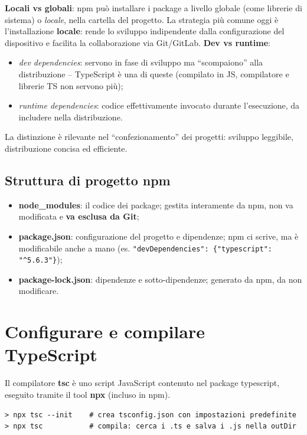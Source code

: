 \begin{importante}
\textbf{Locali vs globali}: npm pu\`o installare i package a livello globale (come librerie
di sistema) o \emph{locale}, nella cartella del progetto. La strategia pi\`u comune oggi \`e
l'installazione \textbf{locale}: rende lo sviluppo indipendente dalla configurazione del
dispositivo e facilita la collaborazione via Git/GitLab.
\textbf{Dev vs runtime}:
\begin{itemize}
  \item \emph{dev dependencies}: servono in fase di sviluppo ma ``scompaiono'' alla
        distribuzione -- TypeScript \`e una di queste (compilato in JS, compilatore e
        librerie TS non servono pi\`u);
  \item \emph{runtime dependencies}: codice effettivamente invocato durante l'esecuzione, da
        includere nella distribuzione.
\end{itemize}
La distinzione \`e rilevante nel ``confezionamento'' dei progetti: sviluppo leggibile,
distribuzione concisa ed efficiente.
\end{importante}

\subsection{Struttura di progetto npm}
\begin{itemize}
  \item \textbf{node\_modules}: il codice dei package; gestita interamente da npm, non va
        modificata e \textbf{va esclusa da Git};
  \item \textbf{package.json}: configurazione del progetto e dipendenze; npm ci scrive, ma \`e
        modificabile anche a mano
        (es. \texttt{"devDependencies": \{"typescript": "\^{}5.6.3"\}});
  \item \textbf{package-lock.json}: dipendenze e sotto-dipendenze; generato da npm, da non
        modificare.
\end{itemize}

\section{Configurare e compilare TypeScript}

Il compilatore \textbf{tsc} \`e uno script JavaScript contenuto nel package typescript,
eseguito tramite il tool \textbf{npx} (incluso in npm).
\begin{lstlisting}
> npx tsc --init    # crea tsconfig.json con impostazioni predefinite
> npx tsc           # compila: cerca i .ts e salva i .js nella outDir
\end{lstlisting}

